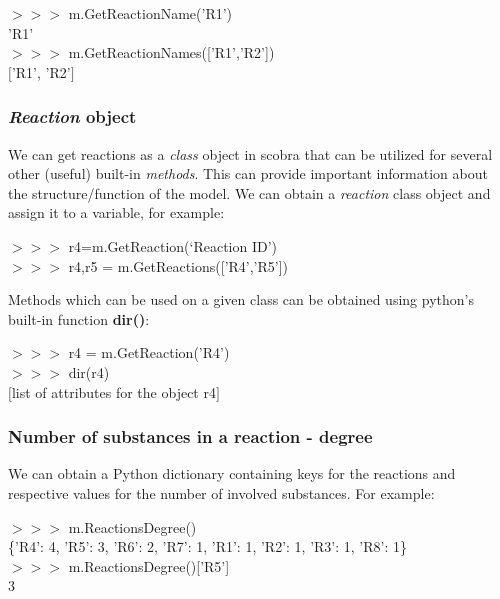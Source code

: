 \begin{framed}
$>>>$ m.GetReactionName('R1')\\
'R1'\\

$>>>$ m.GetReactionNames(['R1','R2'])\\
$[$'R1', 'R2'$]$
\end{framed}


\subsubsection{\textit{Reaction}  object}
We can get reactions as a \textit{class} object in scobra that can be utilized for several other (useful) built-in \textit{methods}. This can provide important information about the structure/function of the model. We can obtain a \textit{reaction} class object and assign it to a variable, for example:

\begin{framed}
$>>>$ r4=m.GetReaction(`Reaction ID')\\
$>>>$ r4,r5 = m.GetReactions(['R4','R5'])
\end{framed}

Methods which can be used on a given class can be obtained using python's built-in function \textbf{dir()}:
\begin{framed}
$>>>$ r4 = m.GetReaction('R4')\\
$>>>$ dir(r4)\\
$[$list of attributes for the object r4$]$
\end{framed}


\subsubsection{Number of substances in a reaction - degree}

We can obtain a Python dictionary containing keys for the reactions and respective values for the number of involved substances. For example:

\begin{framed}
$>>>$ m.ReactionsDegree()\\
\{'R4': 4, 'R5': 3, 'R6': 2, 'R7': 1, 'R1': 1, 'R2': 1, 'R3': 1, 'R8': 1\}\\

$>>>$ m.ReactionsDegree()['R5']\\
3
\end{framed}

